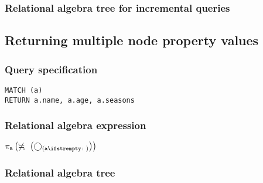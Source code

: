
\subsubsection*{Relational algebra tree for incremental queries}


\subsection{Returning multiple node property values}

\subsubsection*{Query specification}

\begin{lstlisting}
MATCH (a)
RETURN a.name, a.age, a.seasons
\end{lstlisting}

\subsubsection*{Relational algebra expression}

$\projection{\var{a}} \left(\alldifferent{} \left(\getvertices{a}{}\right)\right)$

\subsubsection*{Relational algebra tree}


